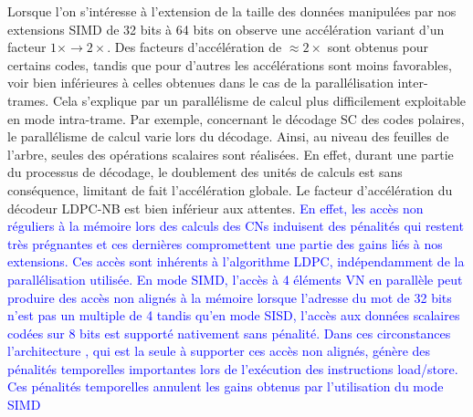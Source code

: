 \documentclass[../main.tex]{subfiles}
\begin{document}
Lorsque l'on s'intéresse à l'extension de la taille des données manipulées par nos extensions SIMD de 32 bits à 64 bits on observe une accélération variant d'un facteur $1\times \rightarrow 2\times$. 
Des facteurs d'accélération de $\approx 2\times$ sont obtenus pour certains codes, tandis que pour d'autres les accélérations sont moins favorables, voir bien inférieures à celles obtenues dans le cas de la parallélisation inter-trames.
Cela s'explique par un parallélisme de calcul plus difficilement exploitable en mode intra-trame.
Par exemple, concernant le décodage SC des codes polaires, le parallélisme de calcul varie lors du décodage.
Ainsi, au niveau des feuilles de l'arbre, seules des opérations scalaires sont réalisées.
En effet, durant une partie du processus de décodage, le doublement des unités de calculs est sans conséquence, limitant de fait l'accélération globale.
Le facteur d'accélération du décodeur LDPC-NB est bien inférieur aux attentes.
\textcolor{blue}{En effet, les accès non réguliers à la mémoire lors des calculs des CNs induisent des pénalités qui restent très prégnantes et ces dernières compromettent une partie des gains liés à nos extensions. Ces accès sont inhérents à l'algorithme LDPC, indépendamment de la parallélisation utilisée. En mode SIMD, l'accès à 4 éléments VN en parallèle peut produire des accès non alignés à la mémoire lorsque l'adresse du mot de 32 bits n'est pas un multiple de 4 tandis qu'en mode SISD, l'accès aux données scalaires codées sur 8 bits est supporté nativement sans pénalité. Dans ces circonstances l'architecture \IBEX, qui est la seule à supporter ces accès non alignés, génère des pénalités temporelles importantes lors de l'exécution des instructions load/store. Ces pénalités temporelles annulent les gains obtenus par l'utilisation du mode SIMD} 
\end{document}
